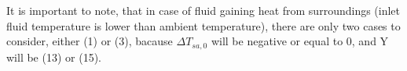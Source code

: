 \documentclass[10pt, letterpaper]{article}
\begin{document}
	It is important to note, that in case of fluid gaining heat from surroundings (inlet fluid temperature is lower than ambient temperature), there are only two cases to consider, either (1) or (3), bacause $\Delta{T_{sa,0}}$ will be negative or equal to 0, and Y will be (13) or (15).


\end{document}
